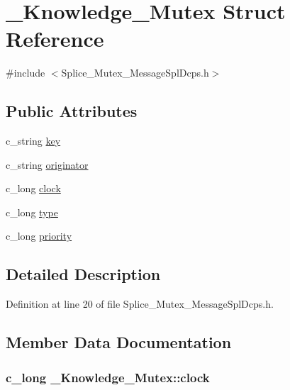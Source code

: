 \hypertarget{struct__Knowledge__Mutex}{
\section{\_\-Knowledge\_\-Mutex Struct Reference}
\label{dd/d1e/struct__Knowledge__Mutex}
}


{\ttfamily \#include $<$Splice\_\-Mutex\_\-MessageSplDcps.h$>$}

\subsection*{Public Attributes}
\begin{DoxyCompactItemize}
\item 
c\_\-string \hyperlink{struct__Knowledge__Mutex_ab8099fb08c35e3ab6b8062520337dfdb}{key}
\item 
c\_\-string \hyperlink{struct__Knowledge__Mutex_a6138eb4fcdd84548dcc4a21073552e67}{originator}
\item 
c\_\-long \hyperlink{struct__Knowledge__Mutex_a055d58930dbb1d8b3e8353df9ee78f7a}{clock}
\item 
c\_\-long \hyperlink{struct__Knowledge__Mutex_a73077f5d286716cab47c318fcaebd033}{type}
\item 
c\_\-long \hyperlink{struct__Knowledge__Mutex_a6b28be59607195007f7a70bf4d455cf1}{priority}
\end{DoxyCompactItemize}


\subsection{Detailed Description}


Definition at line 20 of file Splice\_\-Mutex\_\-MessageSplDcps.h.



\subsection{Member Data Documentation}
\hypertarget{struct__Knowledge__Mutex_a055d58930dbb1d8b3e8353df9ee78f7a}{
\subsubsection[{clock}]{\setlength{\rightskip}{0pt plus 5cm}c\_\-long {\bf \_\-Knowledge\_\-Mutex::clock}}}
\label{dd/d1e/struct__Knowledge__Mutex_a055d58930dbb1d8b3e8353df9ee78f7a}


